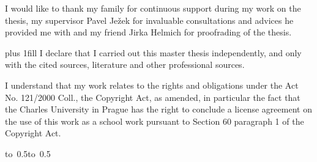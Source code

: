 \documentclass[12pt,a4paper]{report}
\begin{document}
\newpage
\noindent 
I would like to thank my family for continuous support during my work on the thesis, my supervisor Pavel Ježek for invaluable consultations and advices he provided me with and my friend Jirka Helmich for proofrading of the thesis.


\newpage

\vglue 0pt plus 1fill
\noindent
I declare that I carried out this master thesis independently, and only with the cited sources, literature and other professional sources.

\medskip\noindent
I understand that my work relates to the rights and obligations under the Act No. 121/2000 Coll., the Copyright Act, as amended, in particular the fact that the Charles University in Prague has the right to conclude a license agreement on the use of this work as a school work pursuant to Section 60 paragraph 1 of the Copyright Act.

\vspace{10mm}
\hbox{\hbox to 0.5\hbox to 0.5}
\vspace{20mm}



\newpage
\end{document}
